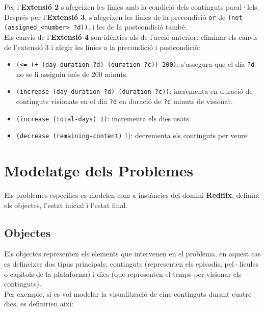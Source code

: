 \documentclass[a4paper]{article}
\begin{document}
	\noindent Per l'\textbf{Extensió 2} s'afegeixen les línies amb la condició dels continguts paral·lels. Després per l'\textbf{Extensió 3}, s'afegeixen les línies de la precondició \texttt{or} de \texttt{(not (assigned\_<number> ?d))}, i les de la postcondició també. \\
	
	\noindent Els canvis de l'\textbf{Extensió 4} son idèntics als de l'acció anterior: eliminar els canvis de l'extensió 3 i afegir les línies a la precondició i postcondició:
	
	\begin{itemize}[label={}, leftmargin=1.5em, itemsep=0pt]
		\item \texttt{(<= (+ (day\_duration ?d) (duration ?c)) 200)}: s'assegura que el dia \texttt{?d} no se li assignin més de 200 minuts. \\
		
		\item \texttt{(increase (day\_duration ?d) (duration ?c))}: incrementa en duració de continguts visionats en el dia \texttt{?d} en duració de \texttt{?c} minuts de visionat.
		
		\item \texttt{(increase (total-days) 1)}: incrementa els dies usats.
		
		\item \texttt{(decrease (remaining-content)} 1): decrementa els continguts per veure
	\end{itemize}
	
	\newpage
	\section{Modelatge dels Problemes}
	
	Els problemes específics es modelen com a instàncies del domini \textbf{Redflix}, definint els objectes, l'estat inicial i l'estat final.
	
	\subsection{Objectes}
	
	Els objectes representen els elements que intervenen en el problema, en aquest cas es defineixes dos tipus principals: continguts (representen els episodis, pel·lícules o capítols de la plataforma) i dies (que representen el temps per visionar els continguts). \\
	
	Per exemple, si es vol modelar la visualització de cinc continguts durant cuatre dies, es definirien així:
	
\end{document}
